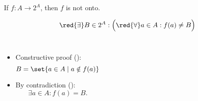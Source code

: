 \begin{frame}{}
  \begin{theorem}
    If $f: A \to 2^{A}$, then $f$ is not onto.
  \end{theorem}

  \[
    \red{\exists} B \in 2^{A}: \Big(\red{\forall} a \in A: f(a) \neq B\Big)
  \]

  \pause
  \begin{columns}[t]
      \begin{itemize}
	\item<2-> Constructive proof (\red{$\exists$}):
	  \[
	    B = \set{a \in A \mid a \notin f(a)}
	  \]
	\item<4-> By contradiction (\red{$\forall$}):
	  \[
	    \exists a \in A: f(a) = B.
	  \]
      \end{itemize}
  \end{columns}

  \vspace{-0.30cm}

  \vspace{-0.60cm}
\end{frame}

